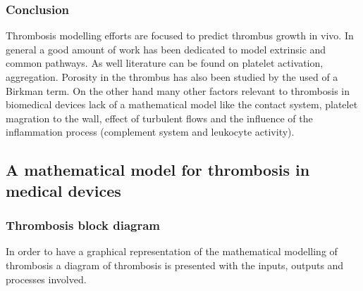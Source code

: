 \documentclass[%
 nofootinbib,
 amsmath,amssymb,
 aps,
 pra,
]{revtex4-1}
\begin{document}
\subsubsection{Conclusion}
Thrombosis modelling efforts are focused to predict thrombus growth in vivo. In general a good amount of work has been dedicated to model extrinsic and common pathways. As well literature can be found on platelet activation, aggregation. Porosity in the thrombus has also been studied by the used of a Birkman term. On the other hand many other factors relevant to thrombosis in biomedical devices lack of a mathematical model like the contact system, platelet magration to the wall, effect of turbulent flows and the influence of the inflammation process (complement system and leukocyte activity). 

\pagebreak
\subsection{A mathematical model for thrombosis in medical devices}
\subsubsection{Thrombosis block diagram}
In order to have a graphical representation of the mathematical modelling of thrombosis a diagram of thrombosis is presented with the inputs, outputs and processes involved. \\
 
\end{document}
